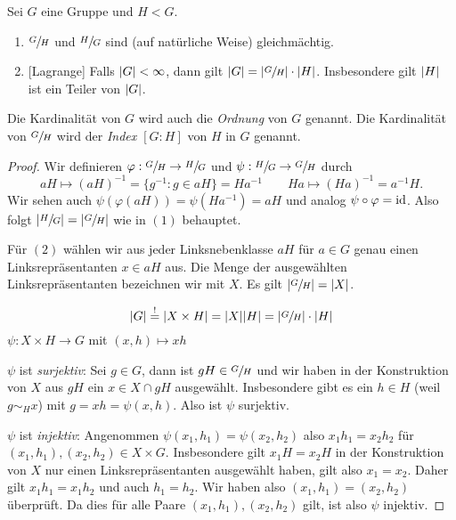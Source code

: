 \begin{theorem}
	Sei $G$ eine Gruppe und $H < G$.
	\begin{enumerate}[(1)]
		\item $\sfrac{G}{H}$ und $\sfrac{H}{G}$ sind (auf natürliche Weise) gleichmächtig.
		\item {[Lagrange]} Falls $\abs{G} < \infty$, dann gilt $\abs{G} = \abs{\sfrac{G}{H}} \cdot \abs{H}$.
			Insbesondere gilt $\abs{H}$ ist ein Teiler von $\abs{G}$.
	\end{enumerate}
\end{theorem}

\begin{definition}
	Die Kardinalität von $G$ wird auch die \emph{Ordnung} von $G$ genannt.
	Die Kardinalität von $\sfrac{G}{H}$ wird der \emph{Index $[G:H]$} von $H$ in $G$ genannt.
\end{definition}

\begin{proof}
	Wir definieren $\varphi: \sfrac{G}{H} \to \sfrac{H}{G}$ und $\psi: \sfrac{H}{G} \to \sfrac{G}{H}$ durch
	\[
		a H \mapsto (a H)^{-1} = \{g^{-1}: g \in a H\} = H a^{-1} \qquad H a \mapsto (Ha)^{-1} = a^{-1} H
	.\] 
	Wir sehen auch $\psi(\varphi(aH)) = \psi(H a^{-1}) = a H $ und analog $\psi \circ \varphi = \operatorname{id}$.
	Also folgt $\abs{\sfrac{H}{G}} = \abs{\sfrac{G}{H}}$ wie in $(1)$ behauptet.

	Für $(2)$ wählen wir aus jeder Linksnebenklasse $a H$ für $a \in G$ genau einen Linksrepräsentanten
	$x \in a H$ aus. Die Menge der ausgewählten Linksrepräsentanten bezeichnen wir mit $X$. Es gilt  $\abs{\sfrac{G}{H}} = \abs{X}$.
	\begin{claim}
		\[
			\abs{G} \stackrel{!}{=} \abs{X \times  H} = \abs{X} \abs{H} = \abs{\sfrac{G}{H}} \cdot \abs{H}
		\]
		$\psi: X \times  H \to G$ mit $(x,h) \mapsto  x h $
	\end{claim}
	$\psi$ ist \emph{surjektiv}: Sei $g \in G$, dann ist $gH \in \sfrac{G}{H}$ und wir haben in der Konstruktion von $X$ aus $g H$ ein $x \in X \cap g H$ 
	ausgewählt. Insbesondere gibt es ein $h \in H$ (weil $g \sim_{H} x$) mit $g = xh = \psi(x,h)$. Also ist $\psi$ surjektiv.

	$\psi$ ist \emph{injektiv}: Angenommen $\psi(x_1,h_1) = \psi(x_2,h_2)$ also $x_1 h_1 = x_2 h_2$ für $(x_1,h_1),(x_2,h_2) \in X \times G$.
	Insbesondere gilt $x_1 H = x_2 H$ in der Konstruktion von $X$ nur einen Linksrepräsentanten ausgewählt haben,
	gilt also $x_1 = x_2$. Daher gilt $x_1 h_1 = x_1 h_2$ und auch $h_1 = h_2$. 
	Wir haben also $(x_1,h_1) = (x_2,h_2)$ überprüft. Da dies für alle Paare $(x_1,h_1),(x_2,h_2)$ gilt, ist also $\psi$ injektiv.
\end{proof}

